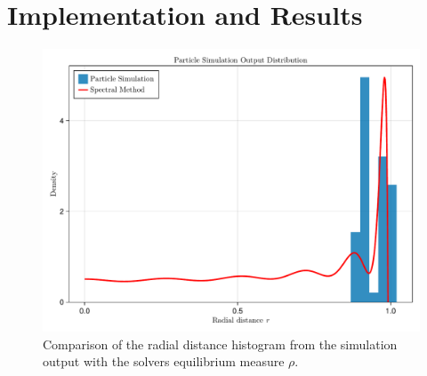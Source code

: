 \chapter{Implementation and Results}
\label{chap:implementation-and-results}



\begin{figure}[H]
  \centering
  \label{fig:simulation-solver-comparison}
  \includegraphics[width=0.6\linewidth]{../figures/results/simulation-solver-comparison.pdf}
  \caption{Comparison of the radial distance histogram from the simulation output with the solvers equilibrium measure $\rho$.}
\end{figure}
